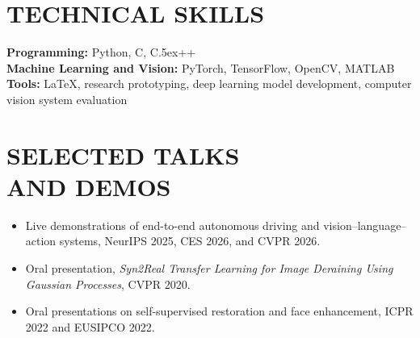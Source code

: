 \documentclass[margin,11pt]{resume}
\def\Cplusplus{{\rm C\raise.5ex\hbox{\small ++}}}
\begin{document}
\vspace{-0.8em}
\section{\footnotesize {\large T}ECHNICAL {\large S}KILLS}
\textbf{Programming:} Python, C, \Cplusplus\\
\textbf{Machine Learning and Vision:} PyTorch, TensorFlow, OpenCV, MATLAB\\
\textbf{Tools:} \LaTeX, research prototyping, deep learning model development, computer vision system evaluation

\vspace{-0.8em}
\section{\footnotesize {\large S}ELECTED {\large T}ALKS\\ {\large A}ND {\large D}EMOS}
\begin{itemize}[leftmargin=*,itemsep=1pt,topsep=2pt]
    \item Live demonstrations of end-to-end autonomous driving and vision--language--action systems, NeurIPS 2025, CES 2026, and CVPR 2026.
    \item Oral presentation, \textit{Syn2Real Transfer Learning for Image Deraining Using Gaussian Processes}, CVPR 2020.
    \item Oral presentations on self-supervised restoration and face enhancement, ICPR 2022 and EUSIPCO 2022.
\end{itemize}
\end{document}
